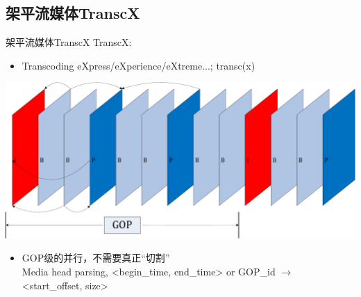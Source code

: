 \documentclass{beamer}
\begin{document}
\subsection{架平流媒体TranscX}
\begin{frame}{架平流媒体TranscX}
TranscX: 
\begin{itemize}
	\item Transcoding eXpress/eXperience/eXtreme...; transc(x)
\end{itemize}
\begin{center}
\includegraphics[scale=0.20]{fig/GOP.pdf}
\end{center}
\begin{itemize}
\item GOP级的并行，不需要真正“切割”\\
Media head parsing, <begin\_time, end\_time> or GOP\_id $\rightarrow$ <start\_offset, size>
\end{itemize}
\end{frame}
\end{document}

